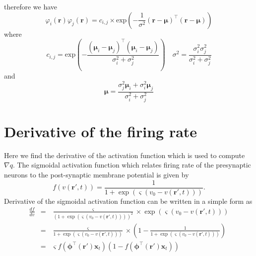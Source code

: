 \documentclass[]{article}
\begin{document}
therefore we have
\begin{equation}
 \varphi_i(\mathbf r)\varphi_j(\mathbf r)=c_{i,j}\times\mathrm{exp}\left({-\frac{1}{\sigma^2} (\mathbf r-\boldsymbol \mu)^\top(\mathbf r-\boldsymbol\mu)}\right)
\end{equation}
where
\begin{equation}
 c_{i,j}=\mathrm{exp}\left(-\frac{(\boldsymbol \mu_i-\boldsymbol\mu_j)^\top(\boldsymbol \mu_i-\boldsymbol\mu_j)}{\sigma_i^2+\sigma_j^2}\right) \quad \sigma^2=\frac{\sigma_i^2\sigma_j^2}{\sigma_i^2+\sigma_j^2}
\end{equation}
and
\begin{equation}
 \boldsymbol\mu=\frac{\sigma_j^2\boldsymbol\mu_i+\sigma_i^2\boldsymbol\mu_j}{\sigma_i^2+\sigma_j^2}
\end{equation}
\section*{Derivative of the firing rate}\label{sec:FiringrateDerivative} 
Here we find the derivative of the activation function which is used to compute  $\nabla q$. The sigmoidal activation function which relates firing rate of the presynaptic neurons to the post-synaptic membrane potential is given by
\begin{equation}
	\label{ActivationFunction} f\left( v\left( \mathbf{r}', t \right) \right) = \frac{1}{1 + \exp \left( \varsigma \left( v_0 - v\left(\mathbf{r}',t\right) \right) \right)}. 
\end{equation}
Derivative of the sigmoidal activation function can be written in a simple form as
\begin{eqnarray}
 \frac{df}{dv}&=& \frac{\varsigma}{\left(1 + \exp \left( \varsigma \left( v_0 - v\left(\mathbf{r}',t\right) \right) \right)\right)^2} \times \exp \left( \varsigma \left( v_0 - v\left(\mathbf{r}',t\right) \right) \right) \nonumber \\
&=&\frac{\varsigma}{1 + \exp \left( \varsigma \left( v_0 - v\left(\mathbf{r}',t\right) \right) \right)} \times \left(1-\frac{1}{1 + \exp \left( \varsigma \left( v_0 - v\left(\mathbf{r}',t\right) \right) \right)}\right) \nonumber \\
&=& \varsigma f(\boldsymbol \phi^\top(\mathbf r')\mathbf {x}_t)\left( 1-f( \boldsymbol \phi^\top(\mathbf r')\mathbf {x}_t)\right)
\end{eqnarray}
\end{document}
